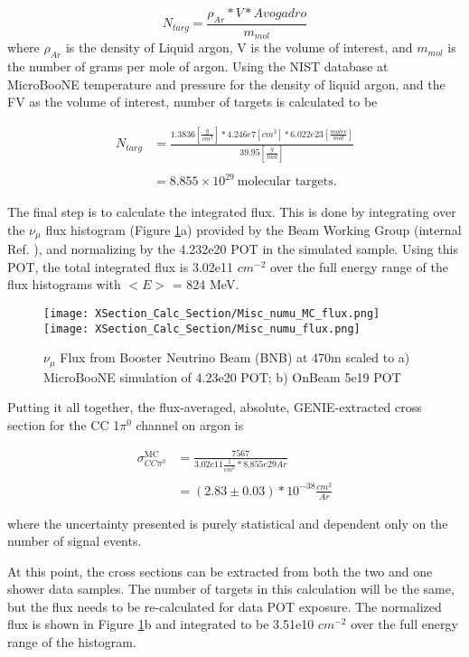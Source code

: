 \begin{equation} \label{eq:1}
  N_{targ} = \frac{\rho_{Ar} * V * Avogadro}{m_{mol}} 
\end{equation}
\noindent where $\rho_{Ar}$ is the density of Liquid argon, V is the volume of interest, and $m_{mol}$ is the number of grams per mole of argon.  Using the NIST database at MicroBooNE temperature and pressure for the density of liquid argon, and the FV as the volume of interest, number of targets is calculated to be

\begin{align}
N_{targ} &= \frac{1.3836 [\frac{g}{cm^3}] * 4.246e7 [cm^3] * 6.022e23 [\frac{molec}{mol}]}{39.95 [\frac{g}{mol}]} \\\\
&= 8.855\times10^{29}~\text{molecular targets}.
\end{align}

\par The final step is to calculate the integrated flux.  This is done by integrating over the $\nu_\mu$ flux histogram (Figure \ref{fig:flux}a) provided by the Beam Working Group (internal Ref. \cite{bib:flux}), and normalizing by the 4.232e20 POT in the simulated sample.  Using this POT, the total integrated flux is 3.02e11 $cm^{-2}$ over the full energy range of the flux histograms with $<E>$ = 824 MeV. 
\begin{figure}[H]
\texttt{[image: XSection\_Calc\_Section/Misc\_numu\_MC\_flux.png]}
\texttt{[image: XSection\_Calc\_Section/Misc\_numu\_flux.png]}

\caption{$\nu_\mu$ Flux from Booster Neutrino Beam (BNB) at 470m scaled to a) MicroBooNE simulation of 4.23e20 POT; b) OnBeam 5e19 POT}
\label{fig:flux}
\end{figure}

\noindent Putting it all together, the flux-averaged, absolute, GENIE-extracted cross section for the CC 1$\pi^0$ channel on argon is


\begin{align}
\sigma^{\text{MC}}_{CC\pi^0} &= \frac{7567}{3.02e11 \frac{1}{cm^2} * 8.855e29 Ar } \\\\
&= (2.83 \pm 0.03) *10^{-38} \frac{cm^2}{Ar}
\end{align}


\noindent where the uncertainty presented is purely statistical and dependent only on the number of signal events.  

\par At this point, the cross sections can be extracted from both the two and one shower data samples. The number of targets in this calculation will be the same, but the flux needs to be re-calculated for data POT exposure. The normalized flux is shown in Figure \ref{fig:flux}b and integrated to be 3.51e10 $cm^{-2}$ over the full energy range of the histogram. 

